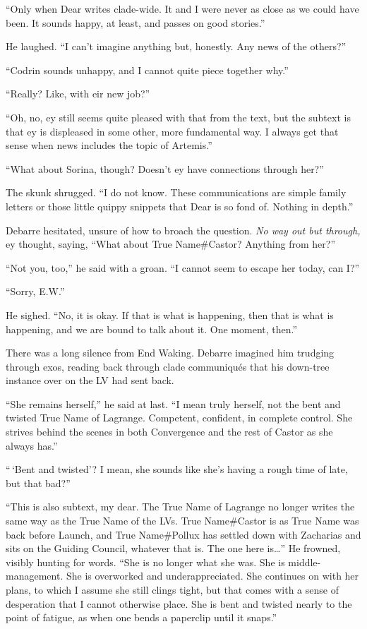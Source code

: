 ``Only when Dear writes clade-wide. It and I were never as close as we could have been. It sounds happy, at least, and passes on good stories.''

He laughed. ``I can't imagine anything but, honestly. Any news of the others?''

``Codrin sounds unhappy, and I cannot quite piece together why.''

``Really? Like, with eir new job?''

``Oh, no, ey still seems quite pleased with that from the text, but the subtext is that ey is displeased in some other, more fundamental way. I always get that sense when news includes the topic of Artemis.''

``What about Sorina, though? Doesn't ey have connections through her?''

The skunk shrugged. ``I do not know. These communications are simple family letters or those little quippy snippets that Dear is so fond of. Nothing in depth.''

Debarre hesitated, unsure of how to broach the question. \emph{No way out but through,} ey thought, saying, ``What about True Name\#Castor? Anything from her?''

``Not you, too,'' he said with a groan. ``I cannot seem to escape her today, can I?''

``Sorry, E.W.''

He sighed. ``No, it is okay. If that is what is happening, then that is what is happening, and we are bound to talk about it. One moment, then.''

There was a long silence from End Waking. Debarre imagined him trudging through exos, reading back through clade communiqués that his down-tree instance over on the LV had sent back.

``She remains herself,'' he said at last. ``I mean truly herself, not the bent and twisted True Name of Lagrange. Competent, confident, in complete control. She strives behind the scenes in both Convergence and the rest of Castor as she always has.''

``\,`Bent and twisted'? I mean, she sounds like she's having a rough time of late, but that bad?''

``This is also subtext, my dear. The True Name of Lagrange no longer writes the same way as the True Name of the LVs. True Name\#Castor is as True Name was back before Launch, and True Name\#Pollux has settled down with Zacharias and sits on the Guiding Council, whatever that is. The one here is\ldots{}'' He frowned, visibly hunting for words. ``She is no longer what she was. She is middle-management. She is overworked and underappreciated. She continues on with her plans, to which I assume she still clings tight, but that comes with a sense of desperation that I cannot otherwise place. She is bent and twisted nearly to the point of fatigue, as when one bends a paperclip until it snaps.''

